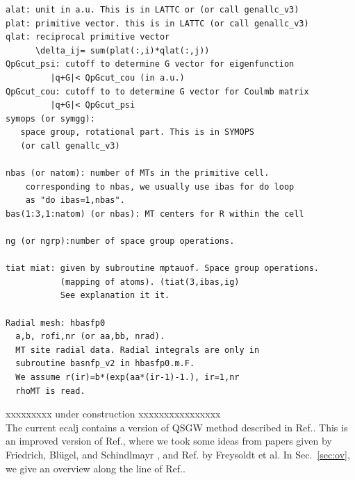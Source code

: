 \documentclass[a4paper,10pt,epsf,fleqn]{article}
\begin{document}
\begin{verbatim}
alat: unit in a.u. This is in LATTC or (or call genallc_v3)
plat: primitive vector. this is in LATTC (or call genallc_v3)
qlat: reciprocal primitive vector  
      \delta_ij= sum(plat(:,i)*qlat(:,j))
QpGcut_psi: cutoff to determine G vector for eigenfunction
         |q+G|< QpGcut_cou (in a.u.)
QpGcut_cou: cutoff to to determine G vector for Coulmb matrix
         |q+G|< QpGcut_psi
symops (or symgg): 
   space group, rotational part. This is in SYMOPS 
   (or call genallc_v3)
   
nbas (or natom): number of MTs in the primitive cell.
    corresponding to nbas, we usually use ibas for do loop
    as "do ibas=1,nbas".
bas(1:3,1:natom) (or nbas): MT centers for R within the cell

ng (or ngrp):number of space group operations. 

tiat miat: given by subroutine mptauof. Space group operations.
           (mapping of atoms). (tiat(3,ibas,ig)
           See explanation it it.

Radial mesh: hbasfp0
  a,b, rofi,nr (or aa,bb, nrad).
  MT site radial data. Radial integrals are only in 
  subroutine basnfp_v2 in hbasfp0.m.F.
  We assume r(ir)=b*(exp(aa*(ir-1)-1.), ir=1,nr
  rhoMT is read.
\end{verbatim}



\label{sec:impl}

xxxxxxxxx under construction xxxxxxxxxxxxxxxx\\

The current ecalj contains a version of QSGW method
described in Ref.\cite{kotani_quasiparticle_2014}.
This is an improved version of 
Ref.\cite{kotani_quasiparticle_2007},
where we took some ideas from papers
given by Friedrich, Bl\"ugel, and Schindlmayr
\cite{friedrich_efficient_2010}, and 
Ref.\cite{Freysoldt2007} by Freysoldt et al.
In Sec.~\ref{sec:ov}, we give an overview along the line of Ref.\cite{kotani_quasiparticle_2014}.
\end{document}
